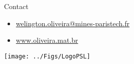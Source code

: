 \documentclass[slidstop,compress,8pt]{beamer}
\newcommand{\pula}{\vspace{.1in}}
\begin{document}
\begin{frame}{ }
\pula

\begin{block}{Contact}
\begin{itemize}
\item [\Letter] \url{ welington.oliveira@mines-paristech.fr}
\item [\Keyboard] \url{www.oliveira.mat.br}
\end{itemize}
\end{block}
\pula


\begin{center}
\texttt{[image: ../Figs/LogoPSL]}
\end{center}
\end{frame}
\end{document}
